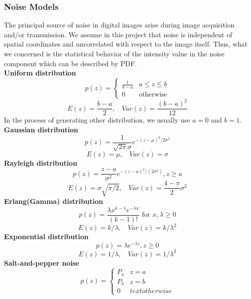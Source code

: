 \subsubsection{Noise Models}
The principal source of noise in digital images arise during image acquisition and/or transmission. We assume in this project that noise is independent of spatial coordinates and uncorrelated with respect to the image itself. Thus, what we concerned is the statistical behavior of the intensity value in the noise component which can be described by PDF.\\ 
\textbf{Uniform distribution}
\begin{equation} p(z)=\left\{ \begin{array}{crl} \frac{1}{b-a} & a\leq z \leq b \\ 0 & \text{otherwise} \end{array} \right. \end{equation} \begin{equation} E(z)=\frac{b-a}{2}, ~~~~ Var(z)=\frac{(b-a)^2}{12} \end{equation}
In the process of generating other distribution, we usually use $a=0$ and $b=1$. \\
\textbf{Gaussian distribution}
\begin{equation}p(z)=\frac{1}{\sqrt{2\pi}\sigma}e^{-(z-\mu)^2/2\sigma^2} \end{equation} \begin{equation} E(z)=\mu, ~~~~ Var(z)=\sigma \end{equation}
\textbf{Rayleigh distribution}
\begin{equation} p(z)=\frac{z-a}{\sigma^2}e^{-(z-a)^2/(2\sigma^2)},  z\geq a  \end{equation} \begin{equation} E(z)=\sigma \sqrt{\pi/2}, ~~~~ Var(z)=\frac{4-\pi}{2}\sigma^2 \end{equation} 
\textbf{Erlang(Gamma) distribution}
\begin{equation} p(z)=\frac{\lambda x^{k-1}e^{-\lambda x}}{(k-1)!} \text{ for $x,\lambda\geq0$} \end{equation} \begin{equation} E(z)=k/\lambda, ~~~~ Var(z)=k/\lambda^2 \end{equation}
\textbf{Exponential distribution} 
\begin{equation} p(z)=\lambda e^{-\lambda z}, z\geq 0 \end{equation} \begin{equation} E(z)=1/\lambda, ~~~~Var(z)=1/\lambda^2 \end{equation}
\textbf{Salt-and-pepper noise}
\begin{equation} p(z)=\left\{ \begin{array}{rcl}P_a & z=a\\P_b & z=b\\0 & text{otherwise} \end{array} \right. \end{equation}

